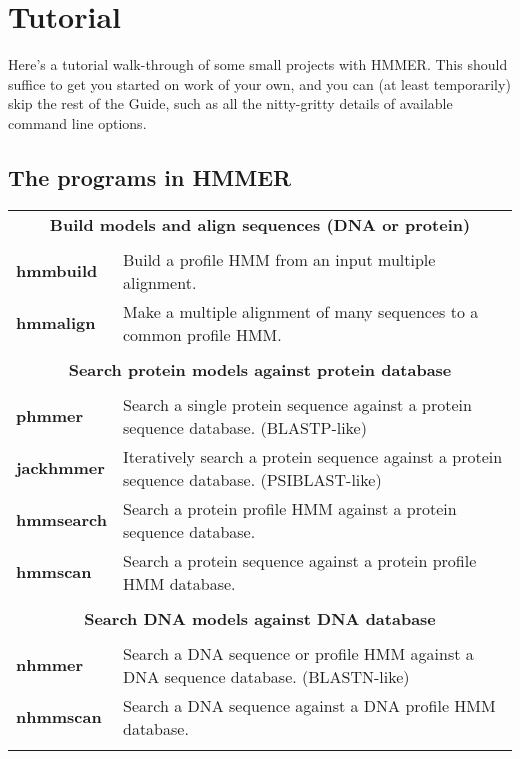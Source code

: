 
\section{Tutorial}
\label{section:tutorial}
\setcounter{footnote}{0}

Here's a tutorial walk-through of some small projects with
HMMER. This should suffice to get you started on work of your own,
and you can (at least temporarily) skip the rest of the Guide,
such as all the nitty-gritty details of available command line
options.

\subsection {The programs in HMMER}

\begin{tabular}{ll}

\multicolumn{2}{c}{\textbf{Build models and align sequences (DNA or protein)}}
\\ & \\ 
\textbf{hmmbuild}  & Build a profile HMM from an input multiple alignment.\\  
\textbf{hmmalign}  & Make a multiple alignment of many sequences to a common profile HMM.\\ 
& \\

\multicolumn{2}{c}{\textbf{Search protein models against protein database}} \\ 
& \\ 
\textbf{phmmer}    & Search a single protein sequence against a protein sequence database. (BLASTP-like) \\
\textbf{jackhmmer} & Iteratively search a protein sequence against a protein sequence database. (PSIBLAST-like) \\ 
\textbf{hmmsearch} & Search a protein profile HMM against a protein sequence database.\\ 
\textbf{hmmscan}   & Search a protein sequence against a protein profile HMM database.\\ 
& \\ 

\multicolumn{2}{c}{\textbf{Search DNA models against DNA database}} \\ 
& \\ 
\textbf{nhmmer}    & Search a DNA sequence or profile HMM against a DNA sequence database. (BLASTN-like)\\
\textbf{nhmmscan}  & Search a DNA sequence against a DNA profile HMM database.\\
& \\


\end{tabular}
